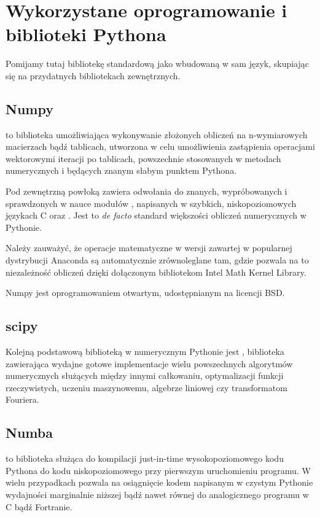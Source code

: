 \section{Wykorzystane oprogramowanie i biblioteki Pythona}

Pomijamy tutaj bibliotekę standardową jako wbudowaną w sam język, skupiając się na przydatnych bibliotekach zewnętrznych.

\subsection{Numpy}
\cite{numpy} to biblioteka umożliwiająca wykonywanie złożonych obliczeń na
n-wymiarowych macierzach bądź tablicach, utworzona w celu umożliwienia
zastąpienia operacjami wektorowymi iteracji po tablicach, powszechnie
stosowanych w metodach numerycznych i będących znanym słabym punktem
Pythona.

Pod zewnętrzną powłoką zawiera odwołania do znanych, wypróbowanych i
sprawdzonych w nauce modułów ,  napisanych w
szybkich, niskopoziomowych językach C oraz .  Jest to
\emph{de facto} standard większości obliczeń numerycznych w Pythonie.

Należy zauważyć, że operacje matematyczne w wersji  zawartej
w popularnej dystrybucji Anaconda są automatycznie zrównoleglane tam, gdzie
pozwala na to niezależność obliczeń dzięki dołączonym bibliotekom Intel Math
Kernel Library.\cite{intel-mkl} 

Numpy jest oprogramowaniem otwartym, udostępnianym na licencji BSD\@.


\subsection{scipy}
Kolejną podstawową biblioteką w numerycznym Pythonie jest \cite{scipy},
biblioteka zawierająca wydajne gotowe implementacje wielu powszechnych algorytmów
numerycznych służących między innymi całkowaniu, optymalizacji funkcji rzeczywistych,
uczeniu maszynowemu, algebrze liniowej czy transformatom Fouriera.

\subsection{Numba}
 to biblioteka służąca do kompilacji just-in-time wysokopoziomowego
kodu Pythona do kodu niskopoziomowego przy pierwszym uruchomieniu programu. W
wielu przypadkach pozwala na osiągnięcie kodem napisanym w czystym Pythonie
wydajności marginalnie niższej bądź nawet równej do analogicznego programu w C
bądź Fortranie.~\cite{numba}

